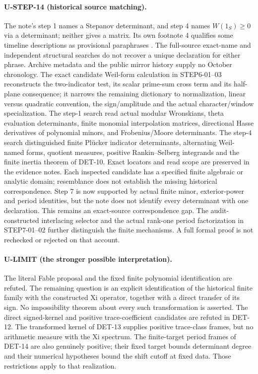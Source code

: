 \documentclass[11pt,a4paper]{article}
\newcommand{\fid}[1]{\textsf{#1}}
\begin{document}
\paragraph{U-STEP-14 (historical source matching).}
The note's step 1 names a Stepanov determinant, and step 4 names $W(1_S)\ge0$ via a determinant; neither gives a matrix. Its own footnote 4 qualifies some timeline descriptions as provisional paraphrases \cite[p.~3, footnote 4]{alpoge}. The full-source exact-name and independent structural searches do not recover a unique declaration for either phrase. Archive metadata and the public mirror history supply no October chronology. The exact candidate Weil-form calculation in \fid{STEP6-01--03} reconstructs the two-indicator test, its scalar prime-sum cross term and its half-plane consequence; it narrows the remaining dictionary to normalization, linear versus quadratic convention, the sign/amplitude and the actual character/window specialization. The step-1 search read actual modular Wronskians, theta evaluation determinants, finite monomial interpolation matrices, directional Hasse derivatives of polynomial minors, and Frobenius/Moore determinants. The step-4 search distinguished finite Pl\"ucker indicator determinants, alternating Weil-named forms, quotient measures, positive Rankin--Selberg integrands and the finite inertia theorem of \fid{DET-10}. Exact locators and read scope are preserved in the evidence notes. Each inspected candidate has a specified finite algebraic or analytic domain; resemblance does not establish the missing historical correspondence. Step 7 is now supported by actual finite minor, exterior-power and period identities, but the note does not identify every determinant with one declaration. This remains an exact-source correspondence gap. The audit-constructed interlacing selector and the actual rank-one period factorization in \fid{STEP7-01--02} further distinguish the finite mechanisms. A full formal proof is not rechecked or rejected on that account.

\paragraph{U-LIMIT (the stronger possible interpretation).}
The literal Fable proposal and the fixed finite polynomial identification are refuted. The remaining question is an explicit identification of the historical finite family with the constructed Xi operator, together with a direct transfer of its sign. No impossibility theorem about every such transformation is asserted. The direct signed-kernel and positive trace-coefficient candidates are refuted in \fid{DET-12}. The transformed kernel of \fid{DET-13} supplies positive trace-class frames, but no arithmetic measure with the Xi spectrum. The finite-target period frames of \fid{DET-14} are also genuinely positive; their fixed target bounds determinant degree and their numerical hypotheses bound the shift cutoff at fixed data. Those restrictions apply to that realization.
\end{document}
